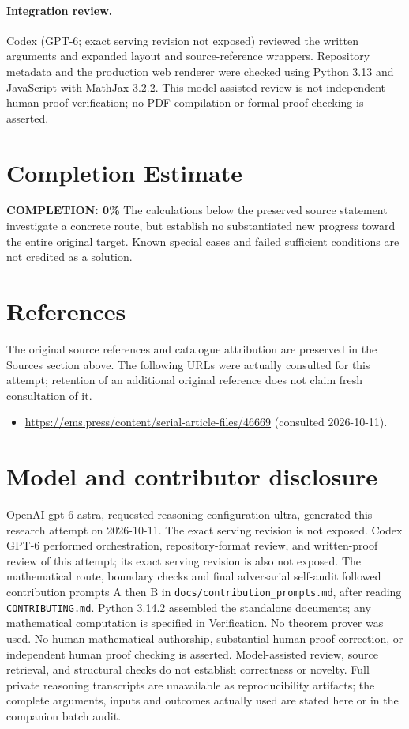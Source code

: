 \documentclass[11pt]{article}
\begin{document}
\paragraph{Integration review.} Codex (GPT-6; exact serving revision not exposed) reviewed the written arguments and expanded layout and source-reference wrappers. Repository metadata and the production web renderer were checked using Python 3.13 and JavaScript with MathJax 3.2.2. This model-assisted review is not independent human proof verification; no PDF compilation or formal proof checking is asserted.

\section{Completion Estimate}
\noindent\textbf{COMPLETION: 0\%}
The calculations below the preserved source statement investigate a concrete route,
but establish no substantiated new progress toward the entire original target.
Known special cases and failed sufficient conditions are not credited as a solution.
\section{References}
The original source references and catalogue attribution are preserved in the
Sources section above. The following URLs were actually consulted for this attempt;
retention of an additional original reference does not claim fresh consultation of it.
\begin{itemize}
\item \url{https://ems.press/content/serial-article-files/46669} (consulted 2026-10-11). 
\end{itemize}
\section{Model and contributor disclosure}
OpenAI gpt-6-astra, requested reasoning configuration ultra, generated this research
attempt on 2026-10-11. The exact serving revision is not exposed. Codex GPT-6
performed orchestration, repository-format review, and written-proof review of this attempt; its exact serving revision
is also not exposed. The mathematical route, boundary checks and final adversarial
self-audit followed contribution prompts A then B in
\texttt{docs/contribution\_prompts.md}, after reading \texttt{CONTRIBUTING.md}.
Python 3.14.2 assembled the standalone documents; any mathematical computation is
specified in Verification. No theorem prover was used. No human mathematical
authorship, substantial human proof correction, or independent human proof checking
is asserted. Model-assisted review, source retrieval, and structural checks do not
establish correctness or novelty. Full private reasoning transcripts are unavailable
as reproducibility artifacts; the complete arguments, inputs and outcomes actually
used are stated here or in the companion batch audit.
\end{document}
